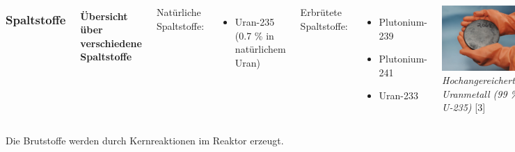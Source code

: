 \documentclass{beamer}[9pt]
\begin{document}
\begin{frame}
\begin{columns}
\frametitle{Spaltstoffe}
\framesubtitle{Übersicht über verschiedene Spaltstoffe}

Natürliche Spaltstoffe:
\begin{itemize}
\item Uran-235 (0.7 \% in natürlichem Uran)
\end{itemize}
Erbrütete Spaltstoffe:
\begin{itemize}
\item Plutonium-239
\item Plutonium-241
\item Uran-233

\end{itemize}
\includegraphics[scale=0.55]{HEUranium.jpg}\\
\textit{Hochangereichertes Uranmetall (99 \% U-235)} [3]
\end{columns}
\vspace{1em}
Die Brutstoffe werden durch Kernreaktionen im Reaktor erzeugt.
\end{frame}
\end{document}
